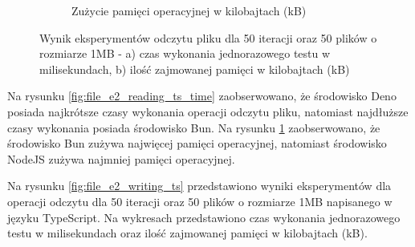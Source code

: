 \begin{figure}[H]
\begin{subfigure}[b]{0.44\textwidth}
    \caption{Zużycie pamięci operacyjnej w kilobajtach (kB)}
    \label{fig:file_e2_reading_ts_memory}
  \end{subfigure}
  \hfill
  \caption{Wynik eksperymentów odczytu pliku dla 50 iteracji oraz 50 plików o rozmiarze 1MB - a) czas wykonania jednorazowego testu w milisekundach, b) ilość zajmowanej pamięci w kilobajtach (kB)}
  \label{fig:file_e2_reading_ts}
\end{figure}

Na rysunku \ref{fig:file_e2_reading_ts_time} zaobserwowano, że środowisko Deno posiada najkrótsze czasy wykonania operacji odczytu pliku, natomiast najdłuższe czasy wykonania posiada środowisko Bun. Na rysunku \ref{fig:file_e2_reading_ts_memory} zaobserwowano, że środowisko Bun zużywa najwięcej pamięci operacyjnej, natomiast środowisko NodeJS zużywa najmniej pamięci operacyjnej.

Na rysunku \ref{fig:file_e2_writing_ts} przedstawiono wyniki eksperymentów dla operacji odczytu dla 50 iteracji oraz 50 plików o rozmiarze 1MB napisanego w języku TypeScript. Na wykresach przedstawiono czas wykonania jednorazowego testu w milisekundach oraz ilość zajmowanej pamięci w kilobajtach (kB).

